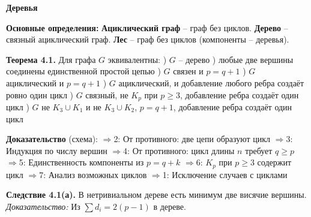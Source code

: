 \textbf{Деревья}

\noindent\textbf{Основные определения:}
\noindent\textbf{Ациклический граф} -- граф без циклов.
\noindent\textbf{Дерево} -- связный ациклический граф.
\noindent\textbf{Лес} -- граф без циклов (компоненты -- деревья).

\noindent\textbf{Теорема 4.1.} Для графа $G$ эквивалентны:
) $G$ -- дерево
) любые две вершины соединены единственной простой цепью
) $G$ связен и $p = q + 1$
) $G$ ациклический и $p = q + 1$
) $G$ ациклический, и добавление любого ребра создаёт ровно один цикл
) $G$ связный, не $K_p$ при $p \geq 3$, добавление ребра создаёт один цикл
) $G$ не $K_3 \cup K_1$ и не $K_3 \cup K_2$, $p = q + 1$, добавление ребра создаёт один цикл

\noindent\textbf{Доказательство} (схема):
$\Rightarrow$2: От противного: две цепи образуют цикл
$\Rightarrow$3: Индукция по числу вершин
$\Rightarrow$4: От противного: цикл длины $n$ требует $q \geq p$
$\Rightarrow$5: Единственность компоненты из $p = q + k$
$\Rightarrow$6: $K_p$ при $p \geq 3$ содержит цикл
$\Rightarrow$7: Анализ возможных циклов
$\Rightarrow$1: Исключение случаев с циклами

\noindent\textbf{Следствие 4.1(а).} В нетривиальном дереве есть минимум две висячие вершины.
\noindent\textit{Доказательство:} Из $\sum d_i = 2(p-1)$ в дереве.